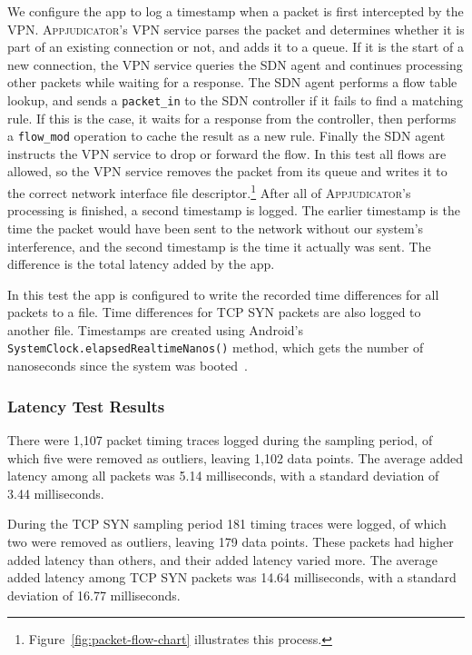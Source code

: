 We configure the app to log a timestamp when a packet is first intercepted by
the VPN. \textsc{Appjudicator}'s VPN service parses the packet and determines
whether it is part of an existing connection or not, and adds it to a queue. If
it is the start of a new connection, the VPN service queries the SDN agent and
continues processing other packets while waiting for a response. The SDN agent
performs a flow table lookup, and sends a \texttt{packet\_in} to the SDN
controller if it fails to find a matching rule. If this is the case, it waits
for a response from the controller, then performs a \texttt{flow\_mod} operation
to cache the result as a new rule. Finally the SDN agent instructs the VPN
service to drop or forward the flow. In this test all flows are allowed, so the
VPN service removes the packet from its queue and writes it to the correct
network interface file descriptor.\footnote{Figure~\ref{fig:packet-flow-chart}
illustrates this process.} After all of \textsc{Appjudicator}'s processing is
finished, a second timestamp is logged. The earlier timestamp is the time the
packet would have been sent to the network without our system's interference,
and the second timestamp is the time it actually was sent. The difference is the
total latency added by the app.

In this test the app is configured to write the recorded time differences for
all packets to a file. Time differences for TCP SYN packets are also logged to
another file. Timestamps are created using Android's
\texttt{SystemClock.elapsedRealtimeNanos()} method, which gets the number of
nanoseconds since the system was booted~\cite{androidsystemclock}.

\subsubsection{Latency Test Results}
\label{sec:latency-test-results}

There were 1,107 packet timing traces logged during the sampling period, of
which five were removed as outliers, leaving 1,102 data points. The average added
latency among all packets was 5.14 milliseconds, with a standard deviation of
3.44 milliseconds.

During the TCP SYN sampling period 181 timing traces were logged, of which two
were removed as outliers, leaving 179 data points. These packets had higher
added latency than others, and their added latency varied more. The average
added latency among TCP SYN packets was 14.64 milliseconds, with a standard
deviation of 16.77 milliseconds.

